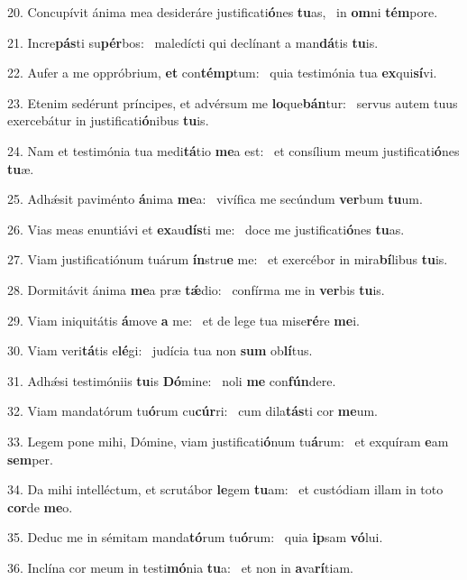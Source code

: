 20. Concupívit ánima mea desideráre justificati\textbf{ó}nes \textbf{tu}as, \ast\  in \textbf{om}ni \textbf{tém}pore.\

21. Incre\textbf{pás}ti su\textbf{pér}bos: \ast\  maledícti qui declínant a man\textbf{dá}tis \textbf{tu}is.\

22. Aufer a me oppróbrium, \textbf{et} con\textbf{témp}tum: \ast\  quia testimónia tua \textbf{ex}qui\textbf{sí}vi.\

23. Etenim sedérunt príncipes, et advérsum me \textbf{lo}que\textbf{bán}tur: \ast\  servus autem tuus exercebátur in justificati\textbf{ó}nibus \textbf{tu}is.\

24. Nam et testimónia tua medi\textbf{tá}tio \textbf{me}a est: \ast\  et consílium meum justificati\textbf{ó}nes \textbf{tu}æ.\

25. Adhǽsit paviménto \textbf{á}nima \textbf{me}a: \ast\  vivífica me secúndum \textbf{ver}bum \textbf{tu}um.\

26. Vias meas enuntiávi et \textbf{ex}au\textbf{dís}ti me: \ast\  doce me justificati\textbf{ó}nes \textbf{tu}as.\

27. Viam justificatiónum tuárum \textbf{ín}stru\textbf{e} me: \ast\  et exercébor in mira\textbf{bí}libus \textbf{tu}is.\

28. Dormitávit ánima \textbf{me}a præ \textbf{tǽ}dio: \ast\  confírma me in \textbf{ver}bis \textbf{tu}is.\

29. Viam iniquitátis \textbf{á}move \textbf{a} me: \ast\  et de lege tua mise\textbf{ré}re \textbf{me}i.\

30. Viam veri\textbf{tá}tis e\textbf{lé}gi: \ast\  judícia tua non \textbf{sum} ob\textbf{lí}tus.\

31. Adhǽsi testimóniis \textbf{tu}is \textbf{Dó}mine: \ast\  noli \textbf{me} con\textbf{fún}dere.\

32. Viam mandatórum tu\textbf{ó}rum cu\textbf{cúr}ri: \ast\  cum dila\textbf{tás}ti cor \textbf{me}um.\

33. Legem pone mihi, Dómine, viam justificati\textbf{ó}num tu\textbf{á}rum: \ast\  et exquíram \textbf{e}am \textbf{sem}per.\

34. Da mihi intelléctum, et scrutábor \textbf{le}gem \textbf{tu}am: \ast\  et custódiam illam in toto \textbf{cor}de \textbf{me}o.\

35. Deduc me in sémitam manda\textbf{tó}rum tu\textbf{ó}rum: \ast\  quia \textbf{ip}sam \textbf{vó}lui.\

36. Inclína cor meum in testi\textbf{mó}nia \textbf{tu}a: \ast\  et non in \textbf{a}va\textbf{rí}tiam.\

